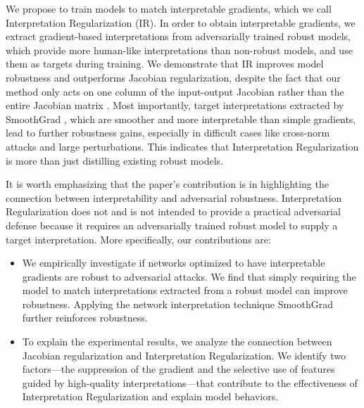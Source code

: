 

We propose to train models to match interpretable gradients, which we call Interpretation Regularization (IR). In order to obtain interpretable gradients, we extract gradient-based interpretations from adversarially trained robust models, which provide more human-like interpretations than non-robust models, and use them as targets during training. We demonstrate that IR improves model robustness and outperforms Jacobian regularization, despite the fact that our method only acts on one column of the input-output Jacobian rather than the entire Jacobian matrix \cite{jacobian_reg,jacobian_reg_improves_generalization,jacobian_reg_approx}. Most importantly, target interpretations extracted by SmoothGrad \cite{smoothgrad}, which are smoother and more interpretable than simple gradients, lead to further robustness gains, especially in difficult cases like cross-norm attacks and large perturbations. This indicates that Interpretation Regularization is more than just distilling existing robust models. 



It is worth emphasizing that the paper's contribution is in highlighting the connection between interpretability and adversarial robustness. Interpretation Regularization does not and is not intended to provide a practical adversarial defense because it requires an adversarially trained robust model to supply a target interpretation. More specifically, our contributions are:
\begin{itemize}
    \itemsep0em
    \item We empirically investigate if networks optimized to have interpretable gradients are robust to adversarial attacks. We find that simply requiring the model to match interpretations extracted from a robust model can improve robustness. Applying the network interpretation technique SmoothGrad further reinforces robustness. 
    \item To explain the experimental results, we analyze the connection between Jacobian regularization and Interpretation Regularization. We identify two factors---the suppression of the gradient and the selective use of features guided by high-quality interpretations---that contribute to the effectiveness of Interpretation Regularization and explain model behaviors. 
    
\end{itemize}

